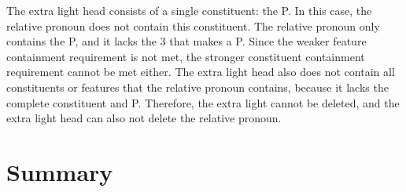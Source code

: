 The extra light head consists of a single constituent: the P.
In this case, the relative pronoun does not contain this constituent. The relative pronoun only contains the P, and it lacks the 3 that makes a P. Since the weaker feature containment requirement is not met, the stronger constituent containment requirement cannot be met either.
The extra light head also does not contain all constituents or features that the relative pronoun contains, because it lacks the complete constituent and P.
Therefore, the extra light cannot be deleted, and the extra light head can also not delete the relative pronoun.

\section{Summary}
